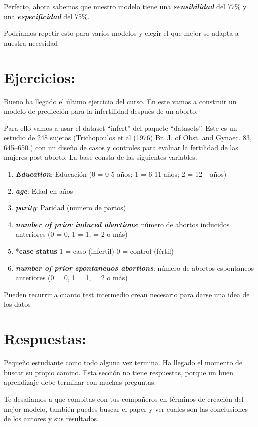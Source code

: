 \documentclass[
]{book}
\providecommand{\tightlist}{%
  \setlength{\itemsep}{0pt}\setlength{\parskip}{0pt}}
\begin{document}
Perfecto, ahora sabemos que nuestro modelo tiene una \textbf{\emph{sensibilidad}} del 77\% y una \textbf{\emph{especificidad}} del 75\%.

Podríamos repetir esto para varios modelos y elegir el que mejor se adapta a nuestra necesidad

\hypertarget{ejercicios-9}{%
\section{\texorpdfstring{ Ejercicios:}{ Ejercicios:}}\label{ejercicios-9}}

Bueno ha llegado el último ejercicio del curso. En este vamos a construir un modelo de predicción para la infertilidad después de un aborto.

Para ello vamos a usar el dataset ``infert'' del paquete ``datasets''. Este es un estudio de 248 sujetos (Trichopoulos et al (1976) Br. J. of Obst. and Gynaec. 83, 645--650.) con un diseño de casos y controles para evaluar la fertilidad de las mujeres post-aborto. La base consta de las siguientes variables:

\begin{enumerate}
\def\labelenumi{\arabic{enumi}.}
\tightlist
\item
  \textbf{\emph{Education}}: Educación (0 = 0-5 años; 1 = 6-11 años; 2 = 12+ años)
\item
  \textbf{\emph{age}}: Edad en años
\item
  \textbf{\emph{parity}}: Paridad (numero de partos)
\item
  \textbf{\emph{number of prior induced abortions}}: número de abortos inducidos anteriores (0 = 0, 1 = 1, = 2 o más)
\item
  *\textbf{case status} 1 = caso (infertil) 0 = control (fértil)
\item
  \textbf{\emph{number of prior spontaneuos abortions}}: número de abortos espontáneos anteriores (0 = 0, 1 = 1, = 2 o más)
\end{enumerate}

Pueden recurrir a cuanto test intermedio crean necesario para darse una idea de los datos

\hypertarget{respuestas-7}{%
\section{\texorpdfstring{ Respuestas:}{ Respuestas:}}\label{respuestas-7}}

Pequeño estudiante como todo alguna vez termina. Ha llegado el momento de buscar su propio camino. Esta sección no tiene respuestas, porque un buen aprendizaje debe terminar con muchas preguntas.

Te desafiamos a que compitas con tus compañeros en términos de creación del mejor modelo, también puedes buscar el paper y ver cuales son las conclusiones de los autores y sus resultados.
\end{document}
